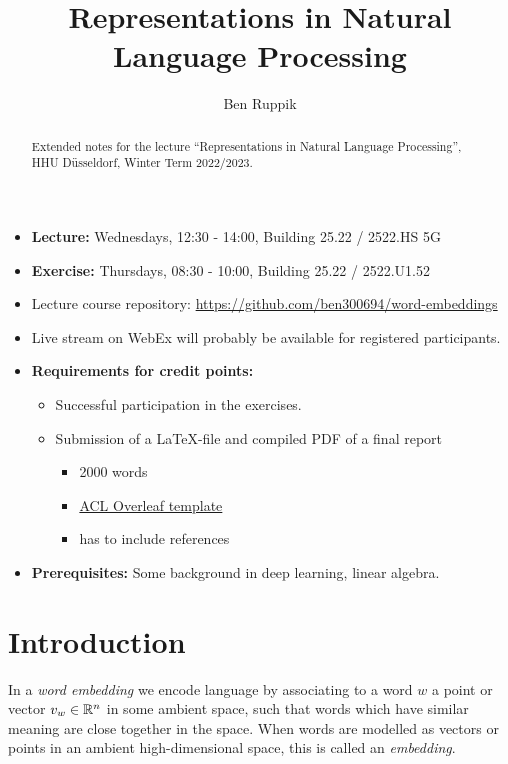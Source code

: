 \documentclass[11pt, a4paper]{amsart}
\title{Representations in Natural Language Processing}
\author{Ben Ruppik}
\begin{document}
\begin{abstract}
    Extended notes for the lecture ``Representations in Natural Language Processing'', HHU D{\"u}sseldorf, Winter Term 2022/2023.
\end{abstract}

\maketitle

\begin{itemize}
    \item \textbf{Lecture:} Wednesdays, 12:30 - 14:00, Building 25.22 / 2522.HS 5G
    \item \textbf{Exercise:} Thursdays, 08:30 - 10:00, Building 25.22 / 2522.U1.52
    \item Lecture course repository: \url{https://github.com/ben300694/word-embeddings}
    \item Live stream on WebEx will probably be available for registered participants.
    \item \textbf{Requirements for credit points:}
    \begin{itemize}
        \item Successful participation in the exercises.
        \item Submission of a  \LaTeX-file and compiled PDF of a final report 
        \begin{itemize}
        	\item 2000 words
        	\item \href{https://www.overleaf.com/latex/templates/acl-2020-proceedings-template/zsrkcwjptpcd}{ACL Overleaf template}
        	\item has to include references
        \end{itemize}
    \end{itemize}
    \item \textbf{Prerequisites:}
    Some background in deep learning,
    linear algebra.
\end{itemize}

\clearpage
\section{Introduction}
\label{sec:intro}

In a \emph{word embedding} we encode language by associating to a word $w$ a point or vector $v_{w} \in \mathbb{R}^{n}$ in some ambient space, such that words which have similar meaning are close together in the space.
When words are modelled as vectors or points in an ambient high-dimensional space, this is called an \emph{embedding}.
\end{document}
